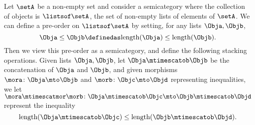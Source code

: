 \begin{example}\label{ex:assoc-stacking-semicat-lists-concat}
Let $\setA$ be a non-empty set and consider a semicategory where the collection of objects is $ \listsof \setA$, the set of non-empty lists of elements of $\setA$. We can define a pre-order on $\listsof \setA$ by setting, for any lists $\Obja, \Objb$, 
\begin{equation}
\Obja \leq \Objb \definedas \text{length}(\Obja) \leq \text{length}(\Objb).
\end{equation}
Then we view this pre-order as a semicategory, and define the following stacking operations. Given lists $\Obja, \Objb$, let $\Obja \mtimescatob \Objb$ be the concatenation of $\Obja$ and $\Objb$, and given morphisms $\mora \colon \Obja \mto \Objb$ and $\morb \colon \Objc \mto \Objd$ representing inequalities, we let $\mora \mtimescatmor \morb \colon \Obja \mtimescatob \Objc \mto \Objb \mtimescatob \Objd$ represent the inequality
\begin{equation}
\text{length}(\Obja \mtimescatob \Objc) \leq \text{length}(\Objb \mtimescatob \Objd).
\end{equation}




\end{example}



